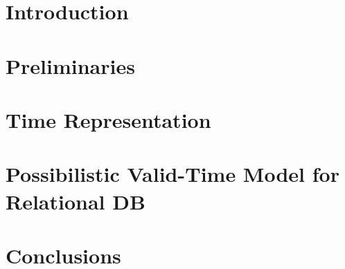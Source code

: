 \documentclass[11pt,twoside]{article}
\begin{document}
\vspace*{10pt}\textlineskip
\begin{multicols}{2}

\section{\label{sec:intro}Introduction}



\section{\label{sec:prelim}Preliminaries}





%

\section{\label{sec:time-rep}Time Representation}


\section{\label{sec:temporal-model}Possibilistic Valid-Time Model for Relational DB}


%

\section{\label{sec:conclusions}Conclusions}



\end{multicols}
\end{document}
